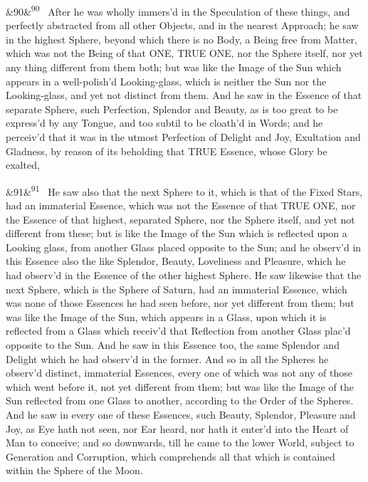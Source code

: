 \documentclass[12pt]{article}
\newcommand{\para}[1][]{\par\noindent\ifx&#1&\else\textsuperscript{\footnotesize #1}~\fi}
\begin{document}
\para[90] After he was wholly immers'd in the Speculation of these things, and perfectly abstracted from all other Objects, and in the nearest Approach; he saw in the highest Sphere, beyond which there is no Body, a Being free from Matter, which was not the Being of that ONE, TRUE ONE, nor the Sphere itself, nor yet any thing different from them both; but was like the Image of the Sun which appears in a well-polish'd Looking-glass, which is neither the Sun nor the Looking-glass, and yet not distinct from them. And he saw in the Essence of that separate Sphere, such Perfection, Splendor and Beauty, as is too great to be express'd by any Tongue, and too subtil to be cloath'd in Words; and he perceiv'd that it was in the utmost Perfection of Delight and Joy, Exultation and Gladness, by reason of its beholding that TRUE Essence, whose Glory be exalted,

\para[91] He saw also that the next Sphere to it, which is that of the Fixed Stars, had an immaterial Essence, which was not the Essence of that TRUE ONE, nor the Essence of that highest, separated Sphere, nor the Sphere itself, and yet not different from these; but is like the Image of the Sun which is reflected upon a Looking glass, from another Glass placed opposite to the Sun; and he observ'd in this Essence also the like Splendor, Beauty, Loveliness and Pleasure, which he had observ'd in the Essence of the other highest Sphere. He saw likewise that the next Sphere, which is the Sphere of Saturn, had an immaterial Essence, which was none of those Essences he had seen before, nor yet different from them; but was like the Image of the Sun, which appears in a Glass, upon which it is reflected from a Glass which receiv'd that Reflection from another Glass plac'd opposite to the Sun. And he saw in this Essence too, the same Splendor and Delight which he had observ'd in the former. And so in all the Spheres he observ'd distinct, immaterial Essences, every one of which was not any of those which went before it, not yet different from them; but was like the Image of the Sun reflected from one Glass to another, according to the Order of the Spheres. And he saw in every one of these Essences, such Beauty, Splendor, Pleasure and Joy, as Eye hath not seen, nor Ear heard, nor hath it enter'd into the Heart of Man to conceive; and so downwards, till he came to the lower World, subject to Generation and Corruption, which comprehends all that which is contained within the Sphere of the Moon.
\end{document}
